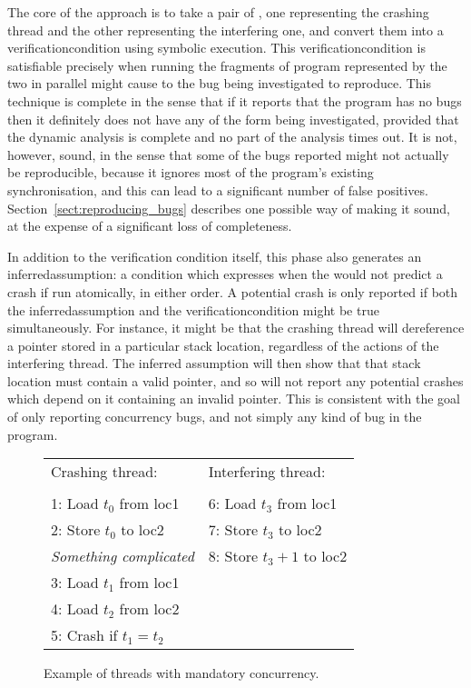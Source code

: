 The core of the approach is to take a pair of {\StateMachines}, one
representing the crashing thread and the other representing the
interfering one, and convert them into a
\gls{verificationcondition}\cite{Floyd1967} using symbolic
execution\cite{King1976}.  This \gls{verificationcondition} is
satisfiable precisely when running the fragments of program
represented by the two {\StateMachines} in parallel might cause to the
bug being investigated to reproduce.  This technique is complete in
the sense that if it reports that the program has no bugs then it
definitely does not have any of the form being investigated, provided
that the dynamic analysis is complete and no part of the analysis
times out.  It is not, however, sound, in the sense that some of the
bugs reported might not actually be reproducible, because it ignores
most of the program's existing synchronisation, and this can lead to a
significant number of false positives.
Section~\ref{sect:reproducing_bugs} describes one possible way of
making it sound, at the expense of a significant loss of completeness.

In addition to the verification condition itself, this phase also
generates an \gls{inferredassumption}: a condition which expresses when the
{\StateMachines} would not predict a crash if run atomically, in
either order.  A potential crash is only reported if both the
\gls{inferredassumption} and the \gls{verificationcondition} might be
true simultaneously.  For instance, it might be that the crashing
thread will dereference a pointer stored in a particular stack
location, regardless of the actions of the interfering thread.  The
inferred assumption will then show that that stack location must
contain a valid pointer, and so {\technique} will not report any
potential crashes which depend on it containing an invalid pointer.
This is consistent with the goal of only reporting concurrency bugs,
and not simply any kind of bug in the program.

\begin{figure}
\begin{centering}
\hfill
\begin{tabular}{p{8cm}l}
Crashing thread:\hfill         & Interfering thread: \\
\\
1: Load $t_0$ from loc1        & 6: Load $t_3$ from loc1 \\
2: Store $t_0$ to loc2         & 7: Store $t_3$ to loc2 \\
\textit{Something complicated} & 8: Store $t_3 + 1$ to loc2 \\
3: Load $t_1$ from loc1        & \\
4: Load $t_2$ from loc2        & \\
5: Crash if $t_1 = t_2$ & \\
\end{tabular}
\hfill
\end{centering}
\caption{Example of threads with mandatory concurrency.}
\label{fig:mandatory_concurrency1}
\end{figure}

